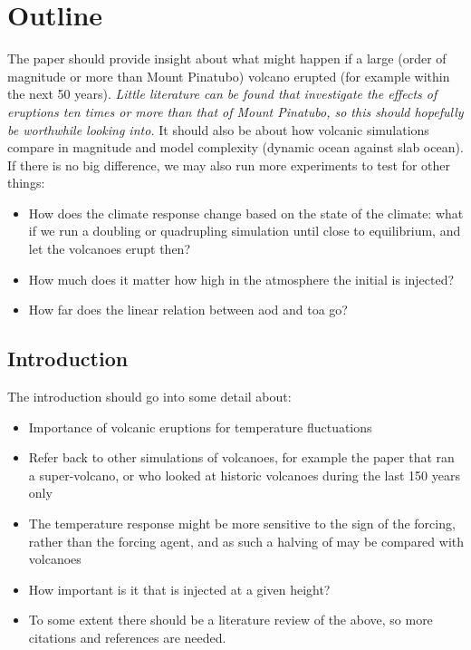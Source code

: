 \documentclass{ametsocV5}
\begin{document}
\section{Outline}

The paper should provide insight about what might happen if a large (order of magnitude
or more than Mount Pinatubo) volcano erupted (for example within the next 50 years).
\emph{Little literature can be found that investigate the effects of eruptions ten times
  or more than that of Mount Pinatubo, so this should hopefully be worthwhile looking
  into.} It should also be about how volcanic simulations compare in magnitude and model
complexity (dynamic ocean against slab ocean). If there is no big difference, we may
also run more experiments to test for other things:
\begin{itemize}
  \item How does the climate response change based on the state of the climate: what if we run a
         doubling or quadrupling simulation until close to equilibrium, and let the
        volcanoes erupt then?
  \item How much does it matter how high in the atmosphere the initial  is injected?
  \item How far does the linear relation between \acrshort{aod} and \acrshort{toa} go?
\end{itemize}

\subsection*{Introduction}

The introduction should go into some detail about:

\begin{itemize}
  \item Importance of volcanic eruptions for temperature fluctuations
  \item Refer back to other simulations of volcanoes, for example the \citet{jones2005} paper
        that ran a super-volcano, or \citet{gregory2016} who looked at historic volcanoes during
        the last 150 years only
  \item The temperature response might be more sensitive to the sign of the forcing, rather than
        the forcing agent, and as such a halving of  may be compared with volcanoes
        \citep{gunther2022}
  \item How important is it that  is injected at a given height?
  \item To some extent there should be a literature review of the above, so more citations and
        references are needed.
\end{itemize}
\end{document}
